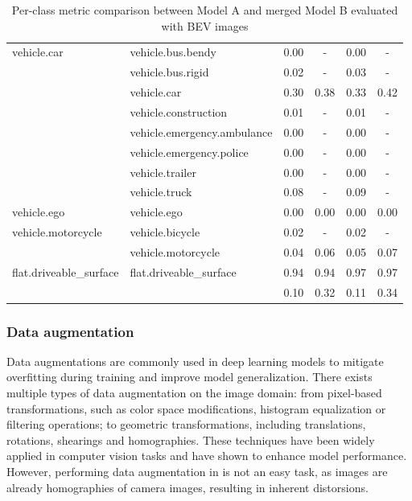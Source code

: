 \begin{table}[h]
\begin{tabular}{llcccc}
    \midrule
    vehicle.car & vehicle.bus.bendy & 0.00 & - & 0.00 & - \\
     & vehicle.bus.rigid & 0.02 & - & 0.03 & - \\
     & vehicle.car & 0.30 & 0.38 & 0.33 & 0.42 \\
     & vehicle.construction & 0.01 & - & 0.01 & - \\
     & vehicle.emergency.ambulance & 0.00 & - & 0.00 & - \\
     & vehicle.emergency.police & 0.00 & - & 0.00 & - \\
     & vehicle.trailer & 0.00 & - & 0.00 & - \\
     & vehicle.truck & 0.08 & - & 0.09 & - \\
    \midrule
    vehicle.ego & vehicle.ego & 0.00 & 0.00 & 0.00 & 0.00 \\
    \midrule
    vehicle.motorcycle & vehicle.bicycle & 0.02 & - & 0.02 & - \\
     & vehicle.motorcycle & 0.04 & 0.06 & 0.05 & 0.07 \\
    \midrule
    flat.driveable\_surface & flat.driveable\_surface & 0.94 & 0.94 & 0.97 & 0.97 \\
    \bottomrule
     & & 0.10 & 0.32 & 0.11 & 0.34 \\
    \bottomrule
    \end{tabular}
    \caption{Per-class metric comparison between Model A and merged Model B evaluated with BEV images}
    \label{tab:merging_comparison_bev}
\end{table}
    



\subsubsection{Data augmentation} \label{sec:data_augmentation}
Data augmentations are commonly used in deep learning models to mitigate overfitting during training and improve model generalization. There exists multiple types of data augmentation on the image domain: from pixel-based transformations, such as color space modifications, histogram equalization or filtering operations; to geometric transformations, including translations, rotations, shearings and homographies. These techniques have been widely applied in computer vision tasks and have shown to enhance model performance. However, performing data augmentation in  is not an easy task, as  images are already homographies of camera images, resulting in inherent distorsions.

